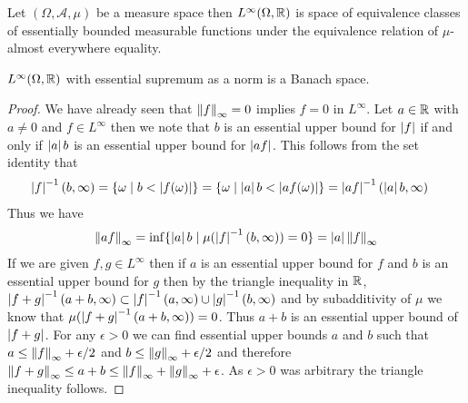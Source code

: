 \begin{defn}Let $(\Omega, \mathcal{A}, \mu)$ be a measure space then $L^\infty(\Omega, \mathbb{R})$ is space of equivalence classes of essentially bounded measurable functions under the equivalence relation of $\mu$-almost everywhere equality.
\end{defn}

\begin{thm}$L^\infty(\Omega, \mathbb{R})$ with essential supremum as a norm is a Banach space.
\end{thm}
\begin{proof}
We have already seen that $\left \lVert f \right \rVert_\infty = 0$ implies $f = 0$ in $L^\infty$.  Let $a \in \mathbb{R}$ with $a \neq 0$ and $f \in L^\infty$ then we note that $b$ is an essential upper bound for $\left \vert f \right \vert$ if and only if $\left \vert a \right \vert b$ is an essential upper bound for $\left \vert af \right \vert$.  This follows from the set identity that
\begin{align*}
\left \vert f \right \vert^{-1}(b,\infty) &= \lbrace \omega \mid b < \left \vert f(\omega) \right \vert \rbrace =  \lbrace \omega \mid \left \vert a \right \vert b < \left \vert af(\omega) \right \vert \rbrace = \left \vert af \right \vert^{-1}(\left \vert a \right \vert b, \infty)
\end{align*}
Thus we have 
\begin{align*}
\left \lVert af \right \rVert_\infty = \inf \lbrace \left \vert a \right \vert b \mid \mu(\left \vert f \right \vert^{-1}(b,\infty)) = 0 \rbrace = \left \vert a \right \vert\left \lVert f \right \rVert_\infty
\end{align*}
If we are given $f, g \in L^\infty$ then if $a$ is an essential upper bound for $f$ and $b$ is an essential upper bound for $g$ then by the triangle inequality in $\mathbb{R}$,  $\left \vert f+g \right \vert^{-1}(a+b, \infty) \subset \left \vert f \right \vert^{-1}(a,\infty) \cup \left \vert g \right \vert^{-1}(b,\infty)$ and by subadditivity of $\mu$ we know that $\mu(\left \vert f+g \right \vert^{-1}(a+b, \infty)) = 0$.  Thus $a+b$ is an essential upper bound of $\left \vert f+g \right \vert$.  For any $\epsilon > 0$ we can find essential upper bounds $a$ and $b$ such that $a \leq \left \lVert f \right \rVert_\infty + \epsilon/2$ and $b \leq \left \lVert g \right \rVert_\infty + \epsilon/2$ and therefore $\left \lVert f+g \right \rVert_\infty \leq a + b \leq \left \lVert f \right \rVert_\infty + \left \lVert g \right \rVert_\infty + \epsilon$.  As $\epsilon > 0$ was arbitrary the triangle inequality follows.


\end{proof}
